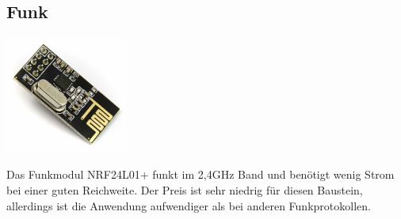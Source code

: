 \documentclass[
  12pt, %
  a4paper, %
  twoside, %
  openany, %
  numbers=noenddot, %
  BCOR=5mm, %
  parskip=half*, %
  thesis, %
]{bfhbook}
\newcommand{\compImgSize}{4cm}
\begin{document}
\subsection{Funk}
\begin{minipage}[t]{0.5\linewidth}
        \includegraphics[width=\compImgSize, valign=t]{Bilder/NRF24.jpg} %
        \captionsetup{justification=raggedright}
\end{minipage}
\begin{minipage}[t]{0.5\linewidth}
Das Funkmodul NRF24L01+ \footnotemark funkt im 2,4GHz Band und benötigt wenig Strom bei einer guten Reichweite. Der Preis ist sehr niedrig für diesen Baustein, allerdings ist die Anwendung aufwendiger als bei anderen Funkprotokollen.
\end{minipage}

\listoffigures
\listoftables
\printglossary
\end{document}
